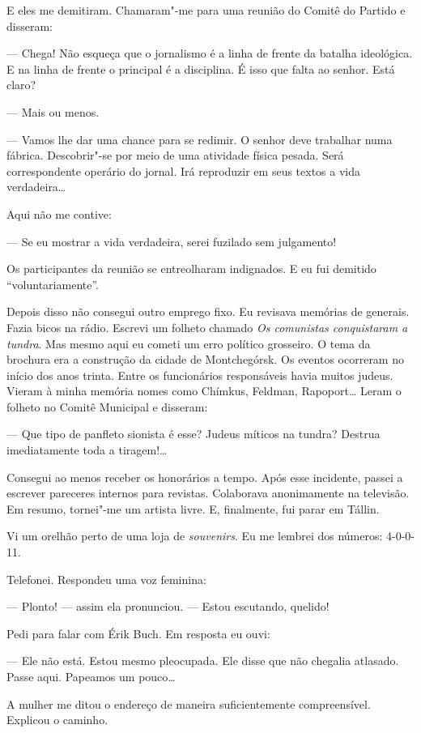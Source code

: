 E eles me demitiram. Chamaram"-me para uma reunião do Comitê do Partido e
disseram:

--- Chega! Não esqueça que o jornalismo é a linha de frente da batalha
ideológica. E na linha de frente o principal é a disciplina. É isso que
falta ao senhor. Está claro?

--- Mais ou menos.

--- Vamos lhe dar uma chance para se redimir. O senhor deve trabalhar
numa fábrica. Descobrir"-se por meio de uma atividade física pesada. Será
correspondente operário do jornal. Irá reproduzir em seus textos a vida
verdadeira\ldots{}

Aqui não me contive:

--- Se eu mostrar a vida verdadeira, serei fuzilado sem julgamento!

Os participantes da reunião se entreolharam indignados. E eu fui
demitido ``voluntariamente''.

Depois disso não consegui outro emprego fixo. Eu revisava memórias de
generais. Fazia bicos na rádio. Escrevi um folheto chamado \emph{Os
comunistas conquistaram a tundra}. Mas mesmo aqui eu cometi um erro
político grosseiro. O tema da brochura era a construção da cidade de
Montchegórsk. Os eventos ocorreram no início dos anos trinta. Entre os
funcionários responsáveis havia muitos judeus. Vieram à minha memória
nomes como Chímkus, Feldman, Rapoport\ldots{} Leram o folheto no Comitê
Municipal e disseram:

--- Que tipo de panfleto sionista é esse? Judeus míticos na tundra?
Destrua imediatamente toda a tiragem!\ldots{}

Consegui ao menos receber os honorários a tempo. Após esse incidente,
passei a escrever pareceres internos para revistas. Colaborava
anonimamente na televisão. Em resumo, tornei"-me um artista livre. E,
finalmente, fui parar em Tállin.

Vi um orelhão perto de uma loja de \emph{souvenirs}. Eu me lembrei dos
números: 4-0-0-11.

Telefonei. Respondeu uma voz feminina:

--- Plonto! --- assim ela pronunciou. --- Estou escutando, quelido!

Pedi para falar com Érik Buch. Em resposta eu ouvi:

--- Ele não está. Estou mesmo pleocupada. Ele disse que não chegalia
atlasado. Passe aqui. Papeamos um pouco\ldots{}

A mulher me ditou o endereço de maneira suficientemente compreensível.
Explicou o caminho.

